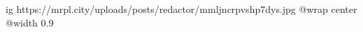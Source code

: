  
 
 
 
 

\ifcmt
  ig https://mrpl.city/uploads/posts/redactor/mmljncrpvshp7dys.jpg
  @wrap center
  @width 0.9
\fi
